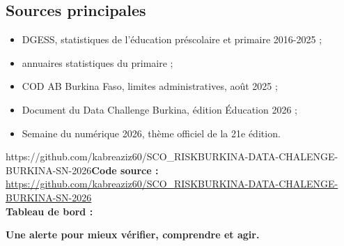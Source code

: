 \documentclass[12pt,a4paper]{article}
\newcommand{\GitHubURL}{https://github.com/kabreaziz60/SCO_RISKBURKINA-DATA-CHALENGE-BURKINA-SN-2026}
\newcommand{\DashboardURL}{}
\begin{document}
\subsection{Sources principales}
\begin{itemize}
  \item DGESS, statistiques de l'éducation préscolaire et primaire 2016-2025 ;
  \item annuaires statistiques du primaire ;
  \item COD AB Burkina Faso, limites administratives, août 2025 ;
  \item Document du Data Challenge Burkina, édition Éducation 2026 ;
  \item Semaine du numérique 2026, thème officiel de la 21e édition.
\end{itemize}

\ifx\GitHubURL\empty\else\textbf{Code source :} \url{\GitHubURL}\\\fi
\ifx\DashboardURL\empty\else\textbf{Tableau de bord :} \url{\DashboardURL}\fi

\vfill
\begin{center}
{\large\bfseries\color{Blue}Une alerte pour mieux vérifier, comprendre et agir.}
\end{center}
\end{document}
